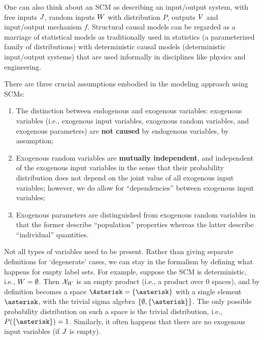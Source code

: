 One can also think about an SCM as describing an input/output system, with free inputs
$J$, random inputs $W$ with distribution $P$, outputs $V$ and input/output mechanism $f$.
Structural causal models can be regarded as a marriage of statistical models as traditionally used in statistics (a parameterized family of distributions) with deterministic causal models (deterministic input/output systems) that are used informally in disciplines like physics and engineering.

\begin{Rem}
There are three crucial assumptions embodied in the modeling approach using SCMs:
\begin{enumerate}
  \item The distinction between endogenous and exogenous variables: exogenous variables
    (i.e., exogenous input variables, exogenous random variables, and exogenous parameters)
    are \textbf{not caused} by endogenous variables, by assumption;
  \item Exogenous random variables are \textbf{mutually independent}, and independent of the
    exogenous input variables in the sense that their probability distribution does
    not depend on the joint value of all exogenous input variables; however, we do
    allow for ``dependencies'' between exogenous input variables;
  \item Exogenous parameters are distinguished from exogenous random variables in that
    the former describe ``population'' properties whereas the latter describe ``individual''
    quantities.
\end{enumerate}
\end{Rem}

\begin{Rem}
  Not all types of variables need to be present. Rather than giving separate definitions for `degenerate' cases, we can stay in the formalism by defining what happens for empty label sets. For example, suppose the SCM is deterministic, i.e., $W = \emptyset$. Then $\mathcal{X}_{W}$ is an empty product (i.e., a product over 0 spaces), and by definition becomes a space $\Asterisk = \{\asterisk\}$ with a single element $\asterisk$, with the trivial sigma algebra $\{\emptyset,\{\asterisk\}\}$. The only possible probability distribution on such a space is the trivial distribution, i.e., $P(\{\asterisk\}) = 1$. Similarly, it often happens that there are no exogenous input variables (if $J$ is empty).
\end{Rem}

